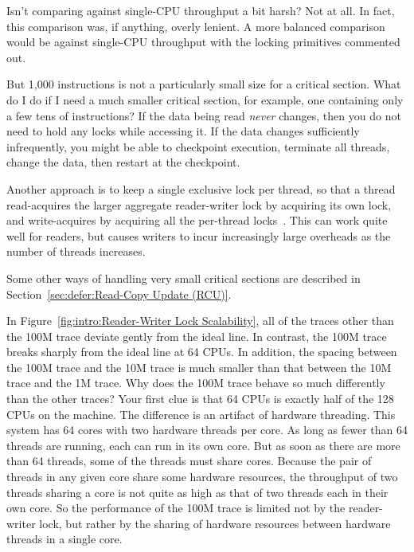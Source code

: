 \QuickQ{}
	Isn't comparing against single-CPU throughput a bit harsh?
\QuickA{}
	Not at all.
	In fact, this comparison was, if anything, overly lenient.
	A more balanced comparison would be against single-CPU
	throughput with the locking primitives commented out.

\QuickQ{}
	But 1,000 instructions is not a particularly small size for
	a critical section.
	What do I do if I need a much smaller critical section, for
	example, one containing only a few tens of instructions?
\QuickA{}
	If the data being read \emph{never} changes, then you do not
	need to hold any locks while accessing it.
	If the data changes sufficiently infrequently, you might be
	able to checkpoint execution, terminate all threads, change
	the data, then restart at the checkpoint.

	Another approach is to keep a single exclusive lock per
	thread, so that a thread read-acquires the larger aggregate
	reader-writer lock by acquiring its own lock, and write-acquires
	by acquiring all the per-thread locks~\cite{WilsonCHsieh92a}.
	This can work quite well for readers, but causes writers
	to incur increasingly large overheads as the number of threads
	increases.

	Some other ways of handling very small critical sections are
	described in Section~\ref{sec:defer:Read-Copy Update (RCU)}.

\QuickQ{}
	In
	Figure~\ref{fig:intro:Reader-Writer Lock Scalability},
	all of the traces other than the 100M trace deviate gently
	from the ideal line.
	In contrast, the 100M trace breaks sharply from the ideal
	line at 64 CPUs.
	In addition, the spacing between the 100M trace and the 10M
	trace is much smaller than that between the 10M trace and the
	1M trace.
	Why does the 100M trace behave so much differently than the
	other traces?
\QuickA{}
	Your first clue is that 64 CPUs is exactly half of the 128
	CPUs on the machine.
	The difference is an artifact of hardware threading.
	This system has 64 cores with two hardware threads per core.
	As long as fewer than 64 threads are running, each can run
	in its own core.
	But as soon as there are more than 64 threads, some of the threads
	must share cores.
	Because the pair of threads in any given core share some hardware
	resources, the throughput of two threads sharing a core is not
	quite as high as that of two threads each in their own core.
	So the performance of the 100M trace is limited not by the
	reader-writer lock, but rather by the sharing of hardware resources
	between hardware threads in a single core.

